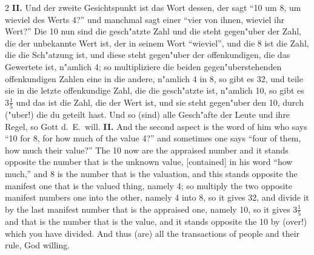 \documentclass[10pt,a4paper]{article}
\renewcommand{\switchcolumn}{\syncronize\nointerlineskip\columnbreak}
\newcommand{\enquote}[1]{``#1''}
\begin{document}
\begin{paracol}{2}
\textbf{II.} Und der zweite Gesichtspunkt ist das Wort dessen, der sagt \enquote{10 um 8, um wieviel des Werts 4?} und manchmal sagt einer \enquote{vier von ihnen, wieviel ihr Wert?} Die 10 nun sind die gesch"atzte Zahl und die steht gegen"uber der Zahl, die der unbekannte Wert ist, der in seinem Wort \enquote{wieviel}, und die 8 ist die Zahl, die die Sch"atzung ist, und diese steht gegen"uber der offenkundigen, die das Gewertete ist, n"amlich 4; so multipliziere die beiden gegen"uberstehenden offenkundigen Zahlen eine in die andere, n"amlich 4 in 8, so gibt es 32, und teile sie in die letzte offenkundige Zahl, die die gesch"atzte ist, n"amlich 10, so gibt es $3\frac{1}{5}$ und das ist die Zahl, die der Wert ist, und sie steht gegen"uber den 10, durch ("uber!) die du geteilt hast. Und so (sind) alle Gesch"afte der Leute und ihre Regel, so Gott d.\ E.\ will.
\switchcolumn
\textbf{II.} And the second aspect is the word of him who says ``10 for 8, for how much of the value 4?'' and sometimes one says ``four of them, how much their value?'' The 10 now are the appraised number and it stands opposite the number that is the unknown value, [contained] in his word ``how much,'' and 8 is the number that is the valuation, and this stands opposite the manifest one that is the valued thing, namely 4; so multiply the two opposite manifest numbers one into the other, namely 4 into 8, so it gives 32, and divide it by the last manifest number that is the appraised one, namely 10, so it gives $3\frac{1}{5}$ and that is the number that is the value, and it stands opposite the 10 by (over!) which you have divided. And thus (are) all the transactions of people and their rule, God willing.
\end{paracol}
\end{document}
